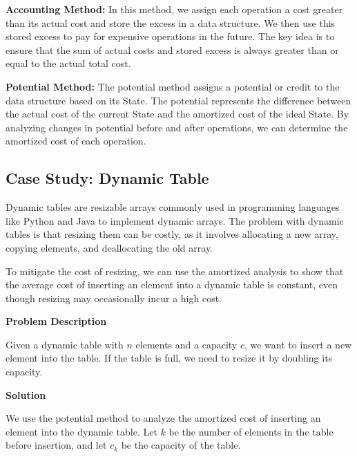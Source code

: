 \documentclass[12pt]{book} %
\begin{document}
\textbf{Accounting Method:} In this method, we assign each operation a cost greater than its actual cost and store the excess in a data structure. We then use this stored excess to pay for expensive operations in the future. The key idea is to ensure that the sum of actual costs and stored excess is always greater than or equal to the actual total cost.

\textbf{Potential Method:} The potential method assigns a potential or credit to the data structure based on its State. The potential represents the difference between the actual cost of the current State and the amortized cost of the ideal State. By analyzing changes in potential before and after operations, we can determine the amortized cost of each operation.

\subsection{Case Study: Dynamic Table}
Dynamic tables are resizable arrays commonly used in programming languages like Python and Java to implement dynamic arrays. The problem with dynamic tables is that resizing them can be costly, as it involves allocating a new array, copying elements, and deallocating the old array.

To mitigate the cost of resizing, we can use the amortized analysis to show that the average cost of inserting an element into a dynamic table is constant, even though resizing may occasionally incur a high cost.

\textbf{Problem Description}

Given a dynamic table with \(n\) elements and a capacity \(c\), we want to insert a new element into the table. If the table is full, we need to resize it by doubling its capacity.

\textbf{Solution}

We use the potential method to analyze the amortized cost of inserting an element into the dynamic table. Let \(k\) be the number of elements in the table before insertion, and let \(c_k\) be the capacity of the table.
\FloatBarrier
\end{document}
